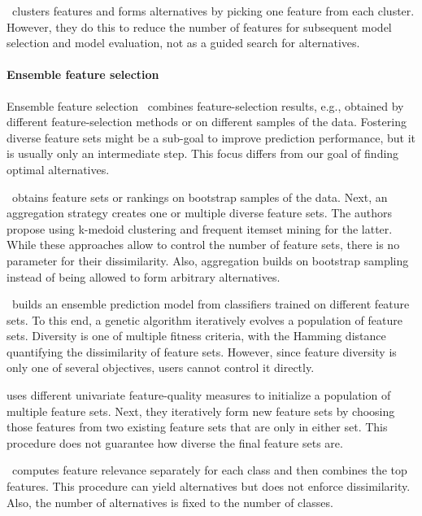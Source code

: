 \documentclass{article}
\theoremstyle{definition}
\begin{document}
\cite{mueller2021feature}~clusters features and forms alternatives by picking one feature from each cluster.
However, they do this to reduce the number of features for subsequent model selection and model evaluation, not as a guided search for alternatives.

\paragraph{Ensemble feature selection}

Ensemble feature selection~\cite{saeys2008robust, seijo2017ensemble} combines feature-selection results, e.g., obtained by different feature-selection methods or on different samples of the data.
Fostering diverse feature sets might be a sub-goal to improve prediction performance, but it is usually only an intermediate step.
This focus differs from our goal of finding optimal alternatives.

\cite{woznica2012model}~obtains feature sets or rankings on bootstrap samples of the data.
Next, an aggregation strategy creates one or multiple diverse feature sets.
The authors propose using k-medoid clustering and frequent itemset mining for the latter.
While these approaches allow to control the number of feature sets, there is no parameter for their dissimilarity.
Also, aggregation builds on bootstrap sampling instead of being allowed to form arbitrary alternatives.

\cite{liu2019subspace}~builds an ensemble prediction model from classifiers trained on different feature sets.
To this end, a genetic algorithm iteratively evolves a population of feature sets.
Diversity is one of multiple fitness criteria, with the Hamming distance quantifying the dissimilarity of feature sets.
However, since feature diversity is only one of several objectives, users cannot control it directly.

\cite{shekar2017diverse} uses different univariate feature-quality measures to initialize a population of multiple feature sets.
Next, they iteratively form new feature sets by choosing those features from two existing feature sets that are only in either set.
This procedure does not guarantee how diverse the final feature sets are.

\cite{guru2018alternative}~computes feature relevance separately for each class and then combines the top features.
This procedure can yield alternatives but does not enforce dissimilarity.
Also, the number of alternatives is fixed to the number of classes.
\end{document}
